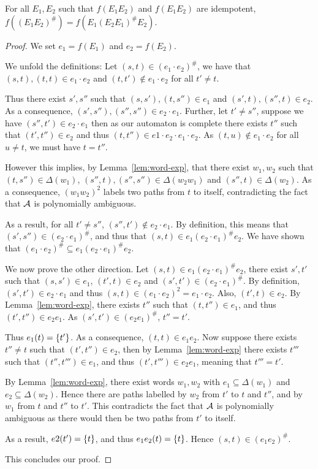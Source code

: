 \documentclass{article}
\begin{document}
\begin{lemma}
	\label{lem:stab-property}
	For all $E_1, E_2$ such that $f(E_1E_2)$ and $f(E_1E_2)$ are idempotent, $f((E_1E_2)^\#) = f(E_1(E_2E_1)^\# E_2)$.
\end{lemma}

\begin{proof}
	We set $e_1 = f(E_1)$ and $e_2 = f(E_2)$.
	
	We unfold the definitions: Let $(s,t) \in (e_1 \cdot e_2)^\#$, we have that $(s,t), (t,t) \in e_1 \cdot e_2$ and $(t,t') \notin e_1 \cdot e_2$ for all $t' \neq t$.
	
	Thus there exist $s', s''$ such that $(s,s'), (t, s'') \in e_1$ and $(s',t), (s'',t) \in e_2$.  As a consequence, $(s', s''), (s'', s'') \in e_2 \cdot e_1$. Further, let $t' \neq s''$, suppose we have $(s'', t') \in e_2\cdot e_1$ then as our automaton is complete there exists $t''$ such that $(t', t'') \in e_2$ and thus $(t, t'') \in e1\cdot e_2 \cdot e_1 \cdot e_2$.
	As $(t, u) \notin e_1 \cdot e_2$ for all $u \neq t$, we must have $t=t''$.
	
	However this implies, by Lemma~\ref{lem:word-exp}, that there exist $w_1, w_2$ such that $(t, s'') \in \Delta(w_1)$, $(s'', t), (s'', s'') \in \Delta(w_2w_1)$ and $(s'',t) \in \Delta(w_2)$. As a consequence, $(w_1w_2)^2$ labels two paths from $t$ to itself, contradicting the fact that $\mathcal{A}$ is polynomially ambiguous.
	
	As a result, for all $t' \neq s''$, $(s'',t') \notin e_2\cdot e_1$. By definition, this means that $(s', s'') \in (e_2 \cdot e_1)^\#$, and thus that $(s,t) \in e_1 (e_2 \cdot e_1)^\# e_2$.
	We have shown that $(e_1\cdot e_2)^\# \subseteq e_1 (e_2 \cdot e_1)^\# e_2$.
	
	We now prove the other direction. Let $(s,t) \in e_1 (e_2 \cdot e_1)^\# e_2$, there exist $s', t'$ such that $(s, s') \in e_1$, $(t',t) \in e_2$ and $(s', t') \in (e_2 \cdot e_1)^\#$.
	By definition, $(s', t') \in e_2\cdot e_1$ and thus $(s,t) \in (e_1\cdot e_2)^2 = e_1 \cdot e_2$. 
	Also, $(t', t) \in e_2$. By Lemma~\ref{lem:word-exp}, there exists $t''$ such that $(t,t'') \in e_1$, and thus $(t', t'') \in e_2 e_1$. As $(s', t') \in (e_2 e_1)^\#$, $t'' = t'$.
	
	Thus $e_1(t) = \{ t' \}$. As a consequence, $(t,t) \in e_1e_2$. Now suppose there exists $t'' \neq t$ such that $(t', t'') \in e_2$, then by Lemma~\ref{lem:word-exp} there exists $t'''$ such that $(t'', t''') \in e_1$, and thus $(t', t''') \in e_2 e_1$, meaning that $t''' = t'$.
	
	By Lemma~\ref{lem:word-exp}, there exist words $w_1, w_2$ with $e_1 \subseteq \Delta(w_1)$ and $e_2 \subseteq \Delta(w_2)$. Hence there are paths labelled by $w_2$ from $t'$ to $t$ and $t''$, and by $w_1$ from $t$ and $t''$ to $t'$. This contradicts the fact that $\mathcal{A}$ is polynomially ambiguous as there would then be two paths from $t'$ to itself.
	
	 As a result, $e2(t') = \{ t \}$, and thus $e_1 e_2 (t) = \{ t \}$.
	 Hence $(s,t) \in (e_1 e_2)^\#$.
	 
	 This concludes our proof.
\end{proof}
\end{document}
